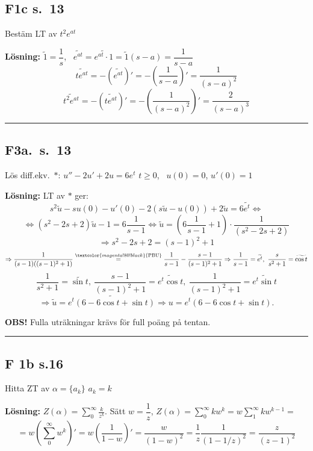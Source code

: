 \subsection{F1c s.\ 13}
Bestäm LT av $t^2 e^{at}$

\textbf{Lösning:} $\tilde{1} = \dfrac{1}{s}$, \ $\widetilde{e^{at}} = \widetilde{e^{at} \cdot 1} = \tilde{1}(s - a) = \dfrac{1}{s - a}$
\[ \widetilde{te^{at}} = -\left( \widetilde{e^{at}} \right)' = -\left( \frac{1}{s - a} \right)' = \frac{1}{(s - a)^2} \]
\[ \widetilde{t^2 e^{at}} = -\left( \widetilde{te^{at}} \right)' = -\left( \frac{1}{(s - a)^2} \right)' = \frac{2}{(s - a)^3} \]

\noindent\rule{\linewidth}{0.4pt}

\subsection{F3a.\ s.\ 13}
Lös diff.ekv.\ \quad $*$: $u'' - 2u' + 2u = 6e^t$ \quad $t \ge 0$, \ $u(0) = 0$, $u'(0) = 1$

\textbf{Lösning:} LT av $*$ ger:
\[ s^2\tilde{u} - su(0) - u'(0) - 2(s\tilde{u} - u(0)) + 2\tilde{u} = 6\widetilde{e^t} \Leftrightarrow \]
\[ \Leftrightarrow (s^2 - 2s + 2)\tilde{u} - 1 = 6\frac{1}{s - 1} \Leftrightarrow \tilde{u} = \left( 6\frac{1}{s - 1} + 1 \right) \cdot \frac{1}{(s^2 - 2s + 2)} \]
\[ \Rightarrow s^2 - 2s + 2 = (s - 1)^2 + 1 \]
\[ \Rightarrow \frac{1}{(s - 1)((s - 1)^2 + 1)} \overset{\textcolor{magenta!80!black}{\text{PBU}}}{=} \frac{1}{s - 1} - \frac{s - 1}{(s - 1)^2 + 1} \Rightarrow \frac{1}{s - 1} = \widetilde{e^t},\ \frac{s}{s^2 + 1} = \widetilde{\cos t} \]
\[ \frac{1}{s^2 + 1} = \widetilde{\sin t},\ \frac{s - 1}{(s - 1)^2 + 1} = \widetilde{e^t \cos t},\ \frac{1}{(s - 1)^2 + 1} = \widetilde{e^t \sin t} \]
\[ \Rightarrow \tilde{u} = \widetilde{e^t(6 - 6\cos t + \sin t)} \Rightarrow u = e^t(6 - 6\cos t + \sin t). \]

\textcolor{red!70!black}{\textbf{OBS!}} Fulla uträkningar krävs för full poäng på tentan.

\noindent\rule{\linewidth}{0.4pt}

\subsection{F 1b s.16}
Hitta ZT av $\alpha = \{a_k\}$ \quad $a_k = k$

\textbf{Lösning:} $Z(\alpha) = \displaystyle\sum_0^\infty \frac{k}{z^k}$. Sätt $w = \dfrac{1}{z}$, $Z(\alpha) = \displaystyle\sum_0^\infty kw^k = w\sum_1^\infty kw^{k-1} =$
\[ = w\left( \sum_0^\infty w^k \right)' = w\left( \frac{1}{1 - w} \right)' = \frac{w}{(1 - w)^2} = \frac{1}{z} \frac{1}{(1 - 1/z)^2} = \frac{z}{(z - 1)^2} \]
